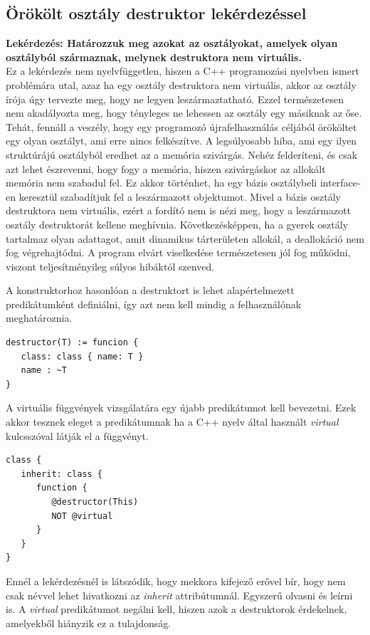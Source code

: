 \documentclass[a4paper,12pt]{report}
\begin{document}
\subsection{Örökölt osztály destruktor lekérdezéssel}
\textbf{Lekérdezés: Határozzuk meg azokat az osztályokat, amelyek olyan osztályból származnak, melynek destruktora nem virtuális.}
\\
Ez a lekérdezés nem nyelvfüggetlen, hiszen a C++ programozási nyelvben ismert problémára utal, azaz ha egy osztály destruktora nem virtuális, akkor az osztály írója úgy tervezte meg, hogy ne legyen leszármaztatható. Ezzel természetesen nem akadályozta meg, hogy tényleges ne lehessen az osztály egy másiknak az őse. Tehát, fennáll a veszély, hogy egy programozó újrafelhasználás céljából örököltet egy olyan osztályt, ami erre nincs felkészítve. A legsúlyosabb hiba, ami egy ilyen struktúrájú osztályból eredhet az a memória szivárgás. Nehéz felderíteni, és csak azt lehet észrevenni, hogy fogy a memória, hiszen szivárgáskor az allokált memória nem szabadul fel. Ez akkor történhet, ha egy bázis osztálybeli interface-en keresztül szabadítjuk fel a leszármazott objektumot. Mivel a bázis osztály destruktora nem virtuális, ezért a fordító nem is nézi meg, hogy a leszármazott osztály destruktorát kellene meghívnia. Következésképpen, ha a gyerek osztály tartalmaz olyan adattagot, amit dinamikus tárterületen allokál, a deallokáció nem fog végrehajtódni. A program elvárt viselkedése természetesen jól fog működni, viszont teljesítményileg súlyos hibáktól szenved.
\par A konstruktorhoz hasonlóan a destruktort is lehet alapértelmezett predikátumként definiálni, így azt nem kell mindig a felhasználónak meghatároznia.
\begin{verbatim}
destructor(T) := funcion {
   class: class { name: T }
   name : ~T
}
\end{verbatim}
\par A virtuális függvények vizsgálatára egy újabb predikátumot kell bevezetni. Ezek akkor tesznek eleget a predikátumnak ha a C++ nyelv által használt \textit{virtual} kulcsszóval látják el a függvényt.
\begin{verbatim}
class {
   inherit: class {
      function { 
         @destructor(This) 
         NOT @virtual 
      }
   }
}
\end{verbatim}
\par Ennél a lekérdezésnél is látszódik, hogy mekkora kifejező erővel bír, hogy nem csak névvel lehet hivatkozni az \textit{inherit} attribútumnál. Egyszerű olvasni és leírni is. A \textit{virtual} predikátumot negálni kell, hiszen azok a destruktorok érdekelnek, amelyekből hiányzik ez a tulajdonság.
\end{document}
